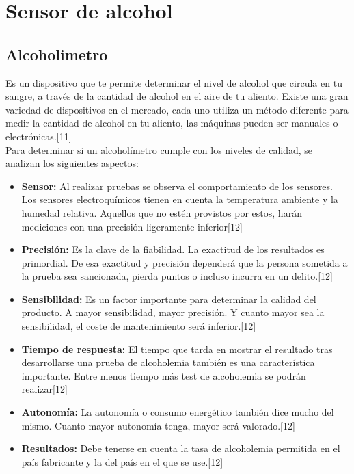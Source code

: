 \chapter{Sensor de alcohol}


\section{Alcoholimetro}
Es un dispositivo que te permite determinar el nivel de alcohol que circula en tu sangre, a través de la cantidad de alcohol en el aire de tu aliento. Existe una gran variedad de dispositivos en el mercado, cada uno utiliza un método diferente para medir la cantidad de alcohol en tu aliento, las máquinas pueden ser manuales o electrónicas.[11] \\
Para determinar si un alcoholímetro cumple con los niveles de calidad, se analizan los siguientes aspectos:
\begin{itemize}
    \item \textbf{Sensor:} Al realizar pruebas se observa el comportamiento de los sensores. Los sensores electroquímicos tienen en cuenta la temperatura ambiente y la humedad relativa. Aquellos que no estén provistos por estos, harán mediciones con una precisión ligeramente inferior[12]
    \item \textbf{Precisión:} Es la clave de la fiabilidad. La exactitud de los resultados es primordial. De esa exactitud y precisión dependerá que la persona sometida a la prueba sea sancionada, pierda puntos o incluso incurra en un delito.[12]
    \item \textbf{Sensibilidad:} Es un factor importante para determinar la calidad del producto. A mayor sensibilidad, mayor precisión. Y cuanto mayor sea la sensibilidad, el coste de mantenimiento será inferior.[12]
    \item \textbf{Tiempo de respuesta:} El tiempo que tarda en mostrar el resultado tras desarrollarse una prueba de alcoholemia también es una característica importante. Entre menos tiempo más test de alcoholemia se podrán realizar[12]
    \item \textbf{Autonomía:} La autonomía o consumo energético también dice mucho del mismo. Cuanto mayor autonomía tenga, mayor será valorado.[12]
    \item \textbf{Resultados:} Debe tenerse en cuenta la tasa de alcoholemia permitida en el país fabricante y la del país en el que se use.[12]
\end{itemize}


